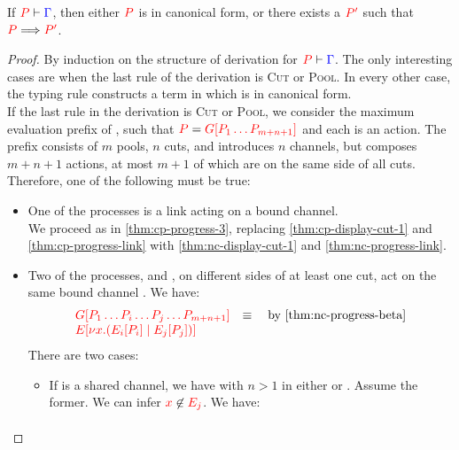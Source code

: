 \begin{theorem}[Progress]\label{thm:nc-progress}
  If $\seq[{ P }]{ \Gamma }$, then either $\tm{P}$ is in canonical form, or
  there exists a $\tm{P'}$ such that $\reducesto{P}{P'}$. 
\end{theorem}
\begin{proof}
  By induction on the structure of derivation for $\seq[{ P }]{ \Gamma }$.
  The only interesting cases are when the last rule of the derivation is
  \textsc{Cut} or \textsc{Pool}. In every other case, the typing rule constructs
  a term in which is in canonical form. 
  \\
  If the last rule in the derivation is \textsc{Cut} or \textsc{Pool}, we
  consider the maximum evaluation prefix  of , such that $\tm{P} =
  \tm{\cpPlug{G}{P_1 \dots P_{m+n+1}}}$ and each  is an action.
  The prefix  consists of $m$ pools, $n$ cuts, and introduces $n$
  channels, but composes $m+n+1$ actions, at most $m+1$ of which are on the same
  side of all cuts.
  Therefore, one of the following must be true:
  \begin{itemize}
  \item
    One of the processes is a link  acting on a bound channel.
    \\
    We proceed as in \cref{thm:cp-progress-3},
    replacing \cref{thm:cp-display-cut-1} and \cref{thm:cp-progress-link}
    with \cref{thm:nc-display-cut-1} and \cref{thm:nc-progress-link}.
  \item
    Two of the processes,  and , on different sides of at least
    one cut, act on the same bound channel . We have:
    \begin{gather*}
      \begin{array}{ll}
        \tm{\cpPlug{G}{P_1 \dots P_i \dots P_j \dots P_{m+n+1}}}
        & \equiv \quad \text{by \cref{thm:nc-progress-beta}} \\
        \tm{\cpPlug{E}{\cpCut{x}{\cpPlug{E_i}{P_i}}{\cpPlug{E_j}{P_j}}}}
      \end{array}
    \end{gather*}
    There are two cases:
    \begin{itemize}
    \item
      If  is a shared channel, we have  with $n > 1$ 
      in either  or .
      Assume the former. 
      We can infer $\notFreeIn{x}{E_j}$.
      We have:
      \begin{gather*}

\end{gather*}
\end{itemize}
\end{itemize}
\end{proof}
